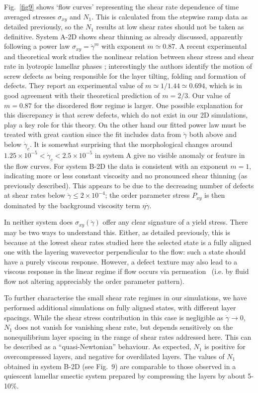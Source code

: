 \documentclass[8.5pt,twoside,twocolumn]{article}
\newcommand{\e}[1]{\times10^{#1}}
\begin{document}
Fig.~\ref{fig9} shows `flow curves' representing the shear rate dependence of time averaged stresses $\sigma_{xy}$ and $N_1$. This is calculated from the stepwise ramp data as detailed previously, so the $N_1$ results at low shear rates should not be taken as definitive. System A-2D shows shear thinning as already discussed, apparently following a power law $\sigma_{xy}=\dot{\gamma}^m$ with exponent $m\simeq 0.87$. A recent experimental and theoretical work studies the nonlinear relation between shear stress and shear rate in lyotropic lamellar phases \cite{Lu08}; interestingly the authors identify the motion of screw defects as being responsible for the layer tilting, folding  and formation of defects. They report an experimental value of $m\simeq 1/1.44\simeq 0.694$, which is in good agreement with their theoretical prediction of $m=2/3$. Our value of $m=0.87$ for the disordered flow regime is larger. One possible explanation for this discrepancy is that screw defects, which do not exist in our 2D simulations, play a key role for this theory. 
On the other hand our fitted power law must be treated with great caution since the fit includes data from $\dot\gamma$ both above and below $\dot\gamma_c$. It is somewhat surprising that the morphological changes around $1.25\e{-5}<\dot\gamma_c <2.5\e{-5}$ in system A give no visible anomaly or feature in the flow curves.
%
For system B-2D the data is consistent with an exponent $m=1$, indicating more or less constant viscosity and no pronounced shear thinning (as previously described). 
This appears to be due to the decreasing number of defects at shear rates below $\dot{\gamma}\le2\e{-4}$; the order parameter stress $P_{xy}$ is then dominated by the background viscosity term $\eta\dot\gamma$. 

{In neither system does $\sigma_{xy}(\dot\gamma)$ offer any clear signature of a yield stress. There may be two ways to understand this. Either, as detailed
previously, this is because at the lowest shear rates studied here the selected
state is a fully aligned one with the layering wavevector perpendicular to
the flow: such a state should have a purely viscous response. However, a defect texture may also lead to a viscous response in the linear regime if flow occurs via permeation~\cite{deGennes} (i.e. by fluid flow not altering appreciably the order parameter pattern). 

To further characterise the small shear rate regimes in our simulations, we have performed additional simulations on fully aligned states, with different layer spacings. While the shear stress contribution in this case is negligible as $\dot{\gamma}\to 0$, $N_1$ does not vanish for vanishing shear rate, but depends sensitively on the nonequilibrium layer spacing in the range of shear rates addressed here.  This can be described as a ``quasi-Newtonian'' behaviour. As expected, $N_1$ is positive for overcompressed layers, and negative for overdilated layers. The values of $N_1$ obtained in system B-2D (see Fig.~9) are comparable to those observed in a quiescent lamellar smectic system prepared by compressing the layers by about 5-10\%.}
\end{document}

